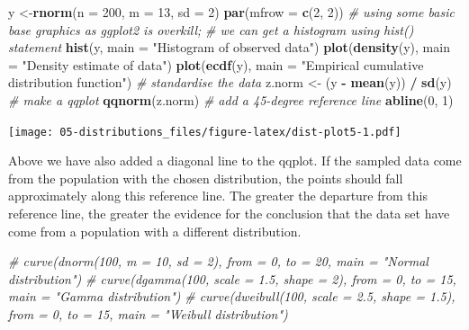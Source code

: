 \documentclass[english,10pt,a4paper,oneside]{book}
\newenvironment{Shaded}{\begin{snugshade}}{\end{snugshade}}
\newcommand{\KeywordTok}[1]{\textcolor[rgb]{0.13,0.29,0.53}{\textbf{#1}}}
\newcommand{\DataTypeTok}[1]{\textcolor[rgb]{0.13,0.29,0.53}{#1}}
\newcommand{\DecValTok}[1]{\textcolor[rgb]{0.00,0.00,0.81}{#1}}
\newcommand{\StringTok}[1]{\textcolor[rgb]{0.31,0.60,0.02}{#1}}
\newcommand{\CommentTok}[1]{\textcolor[rgb]{0.56,0.35,0.01}{\textit{#1}}}
\newcommand{\OperatorTok}[1]{\textcolor[rgb]{0.81,0.36,0.00}{\textbf{#1}}}
\newcommand{\NormalTok}[1]{#1}
\theoremstyle{definition}
\theoremstyle{definition}
\theoremstyle{definition}
\theoremstyle{remark}
\begin{document}
\begin{Shaded}
\begin{Highlighting}[]
\NormalTok{y <-}\KeywordTok{rnorm}\NormalTok{(}\DataTypeTok{n =} \DecValTok{200}\NormalTok{, }\DataTypeTok{m =} \DecValTok{13}\NormalTok{, }\DataTypeTok{sd =} \DecValTok{2}\NormalTok{)}
\KeywordTok{par}\NormalTok{(}\DataTypeTok{mfrow =} \KeywordTok{c}\NormalTok{(}\DecValTok{2}\NormalTok{, }\DecValTok{2}\NormalTok{))}
\CommentTok{# using some basic base graphics as ggplot2 is overkill;}
\CommentTok{# we can get a histogram using hist() statement}
\KeywordTok{hist}\NormalTok{(y, }\DataTypeTok{main =} \StringTok{"Histogram of observed data"}\NormalTok{)}
\KeywordTok{plot}\NormalTok{(}\KeywordTok{density}\NormalTok{(y), }\DataTypeTok{main =} \StringTok{"Density estimate of data"}\NormalTok{)}
\KeywordTok{plot}\NormalTok{(}\KeywordTok{ecdf}\NormalTok{(y), }\DataTypeTok{main =} \StringTok{"Empirical cumulative distribution function"}\NormalTok{)}
\CommentTok{# standardise the data}
\NormalTok{z.norm <-}\StringTok{ }\NormalTok{(y }\OperatorTok{-}\StringTok{ }\KeywordTok{mean}\NormalTok{(y)) }\OperatorTok{/}\StringTok{ }\KeywordTok{sd}\NormalTok{(y) }
\CommentTok{# make a qqplot}
\KeywordTok{qqnorm}\NormalTok{(z.norm)}
\CommentTok{# add a 45-degree reference line}
\KeywordTok{abline}\NormalTok{(}\DecValTok{0}\NormalTok{, }\DecValTok{1}\NormalTok{)}
\end{Highlighting}
\end{Shaded}

\texttt{[image: 05-distributions\_files/figure-latex/dist-plot5-1.pdf]}

Above we have also added a diagonal line to the qqplot. If the sampled
data come from the population with the chosen distribution, the points
should fall approximately along this reference line. The greater the
departure from this reference line, the greater the evidence for the
conclusion that the data set have come from a population with a
different distribution.

\begin{Shaded}
\begin{Highlighting}[]
\CommentTok{# curve(dnorm(100, m = 10, sd = 2), from = 0, to = 20, main = "Normal distribution")}
\CommentTok{# curve(dgamma(100, scale = 1.5, shape = 2), from = 0, to = 15, main = "Gamma distribution")}
\CommentTok{# curve(dweibull(100, scale = 2.5, shape = 1.5), from = 0, to = 15, main = "Weibull distribution")}
\end{Highlighting}
\end{Shaded}
\end{document}
